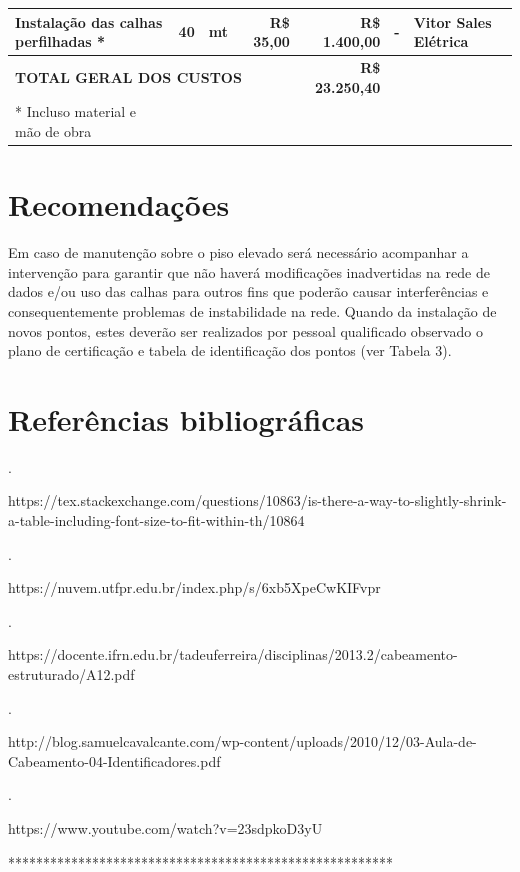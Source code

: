 \documentclass[	DIV=calc,%
							paper=a4,%
							fontsize=12pt,%
							onecolumn]{scrartcl}	 					%
\begin{document}
\begin{table}[H]
{\begin{tabular}{lrcrrll}
		\multicolumn{1}{|l|}{Instalação das calhas perfilhadas *}  & \multicolumn{1}{r|}{40}            & \multicolumn{1}{c|}{mt}            & \multicolumn{1}{r|}{R\$ 35,00}            & \multicolumn{1}{r|}{R\$ 1.400,00}      & \multicolumn{1}{c|}{-}              & \multicolumn{1}{l|}{Vitor Sales Elétrica} \\ \hline
		\multicolumn{4}{l}{\textbf{TOTAL GERAL DOS CUSTOS}}                                                                                                                              & \textbf{R\$ 23.250,40}                 & \multicolumn{2}{l}{}                                                            \\ \hline
		\** Incluso material e mão de obra
	\end{tabular}}
\end{table}


\section{Recomendações}
Em caso de manutenção sobre o piso elevado será necessário acompanhar a intervenção para garantir que não haverá modificações inadvertidas na rede de dados e/ou uso das calhas para outros fins que poderão causar interferências e consequentemente problemas de instabilidade na rede.
Quando da instalação de novos pontos, estes deverão ser realizados por pessoal qualificado observado o plano de certificação e tabela de identificação dos pontos (ver Tabela 3).

\section{Referências bibliográficas}
.

https://tex.stackexchange.com/questions/10863/is-there-a-way-to-slightly-shrink-a-table-including-font-size-to-fit-within-th/10864

.

https://nuvem.utfpr.edu.br/index.php/s/6xb5XpeCwKIFvpr

.

https://docente.ifrn.edu.br/tadeuferreira/disciplinas/2013.2/cabeamento-estruturado/A12.pdf

.

http://blog.samuelcavalcante.com/wp-content/uploads/2010/12/03-Aula-de-Cabeamento-04-Identificadores.pdf

.

https://www.youtube.com/watch?v=23sdpkoD3yU 

*******************************************************
\end{document}
